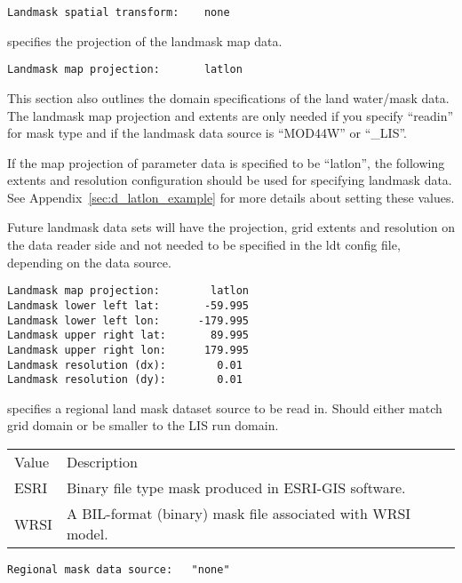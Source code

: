  \begin{Verbatim}[frame=single]
Landmask spatial transform:    none     
 \end{Verbatim}

 
  specifies the projection of the
 landmask map data.
 

 \begin{Verbatim}[frame=single]
Landmask map projection:       latlon
 \end{Verbatim}

 
 This section also outlines the domain specifications of the
 land water/mask data.  The landmask map projection and extents
 are only needed if you specify ``readin'' for mask type and
 if the landmask data source is ``MOD44W'' or ``\_LIS''.  
 
 If the map projection of parameter data is specified to be ``latlon'',
 the following extents and resolution configuration should be used 
 for specifying landmask data.
 See Appendix~\ref{sec:d_latlon_example} for more details about
 setting these values.

 Future landmask data sets will have the projection, grid extents and 
 resolution on the data reader side and not needed to be specified in
 the ldt config file, depending on the data source.
 

 \begin{Verbatim}[frame=single]
Landmask map projection:        latlon
Landmask lower left lat:       -59.995
Landmask lower left lon:      -179.995
Landmask upper right lat:       89.995
Landmask upper right lon:      179.995
Landmask resolution (dx):        0.01
Landmask resolution (dy):        0.01
 \end{Verbatim}



 
  specifies a regional land mask
 dataset source to be read in.  Should either match grid domain
 or be smaller to the LIS run domain.
  
 \begin{tabular}{ll}
 Value     & Description                  \\
 ESRI      & Binary file type mask produced in ESRI-GIS software. \\
 WRSI      & A BIL-format (binary) mask file associated with WRSI model. \\
 \end{tabular}
 

 \begin{Verbatim}[frame=single]
Regional mask data source:   "none"
 \end{Verbatim}

